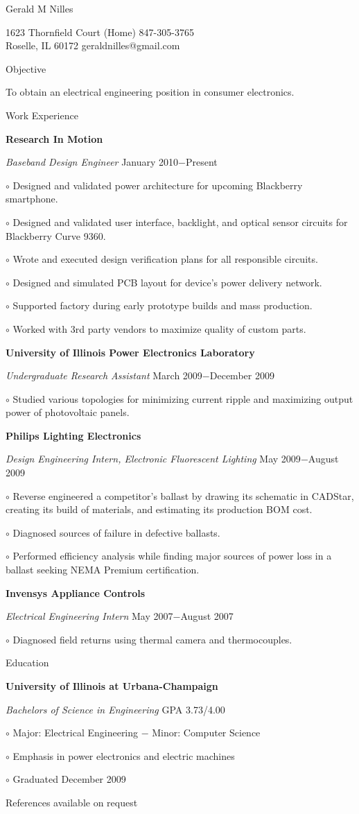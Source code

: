\documentclass[12pt, letterpaper]{article}
\newcommand{\myname}[1]{{\begin{center} \LARGE #1 \end{center} \par }}
\newcommand{\myhead}[1]{{\vspace{2mm} \Large #1 \par}}
\newcommand{\objective}[1]{{\addtolength{\leftskip}{10mm} #1 \par }}
\newcommand{\company}[1]{{\vspace{1mm} \addtolength{\leftskip}{10mm} \textbf{#1} \par}}
\newcommand{\position}[2]{{\addtolength{\leftskip}{10mm} \emph{#1} \hfill #2 \par \vspace{1mm}}}
\newcommand{\skill}[1]{{  \vspace{0.3mm} \addtolength{\leftskip}{20mm} \setlength\parindent{-4mm} $\circ$ #1 \par}}
\begin{document}
\pagestyle{empty}
\raggedright

\myname{Gerald M Nilles}
1623 Thornfield Court  \hfill (Home) 847-305-3765 \\
Roselle, IL 60172   \hfill geraldnilles@gmail.com \\
\myhead{Objective}
    \objective{To obtain an electrical engineering position in consumer electronics.}

\myhead{Work Experience}
    \company{Research In Motion}
    \position{Baseband Design Engineer}{January 2010$-$Present}
        \skill{Designed and validated power architecture for upcoming Blackberry smartphone.}
        \skill{Designed and validated user interface, backlight, and optical sensor circuits for Blackberry Curve 9360.}
        \skill{Wrote and executed design verification plans for all responsible circuits.}
        \skill{Designed and simulated PCB layout for device's power delivery network.}
        \skill{Supported factory during early prototype builds and mass production.}
        \skill{Worked with 3rd party vendors to maximize quality of custom parts.}

    \company{University of Illinois Power Electronics Laboratory}
    \position{Undergraduate Research Assistant}{March 2009$-$December 2009}
        \skill{Studied various topologies for minimizing current ripple and maximizing output power of photovoltaic panels.}

    \company{Philips Lighting Electronics} 
    \position{Design Engineering Intern, Electronic Fluorescent Lighting}{May 2009$-$August 2009}
        \skill{Reverse engineered a competitor's ballast by drawing its schematic in CADStar, creating its build of materials, and estimating its production BOM cost.}
        \skill{Diagnosed sources of failure in defective ballasts.}
        \skill{Performed efficiency analysis while finding major sources of power loss in a ballast seeking NEMA Premium certification.}

    \company{Invensys Appliance Controls}
    \position{Electrical Engineering Intern}{May 2007$-$August 2007}
        \skill{Diagnosed field returns using thermal camera and thermocouples.}

\myhead{Education}
    \company{University of Illinois at Urbana-Champaign}
    \position{Bachelors of Science in Engineering}{GPA 3.73/4.00}
        \skill{Major: Electrical Engineering $-$ Minor: Computer Science}
        \skill{Emphasis in power electronics and electric machines}
        \skill{Graduated December 2009}

\begin{center}
\small
References available on request
\end{center}
\end{document}
